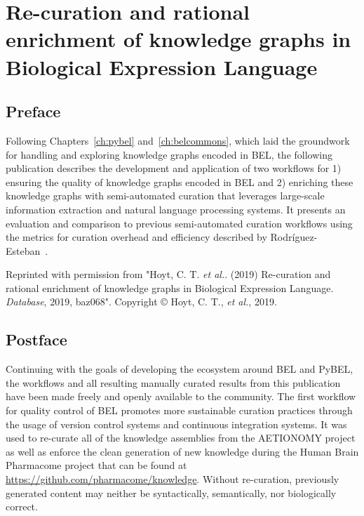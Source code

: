 \chapter{Re-curation and rational enrichment of knowledge graphs in Biological Expression Language}
\label{ch:recuration}

\section*{Preface}

Following Chapters~\ref{ch:pybel} and~\ref{ch:belcommons}, which laid the groundwork for handling and exploring knowledge graphs encoded in \ac{BEL}, the following publication describes the development and application of two workflows for 1) ensuring the quality of knowledge graphs encoded in \ac{BEL} and 2) enriching these knowledge graphs with semi-automated curation that leverages large-scale information extraction and natural language processing systems.
It presents an evaluation and comparison to previous semi-automated curation workflows using the metrics for curation overhead and efficiency described by Rodr\'{i}guez-Esteban~\cite{Rodriguez-Esteban2015}.

\vspace*{\fill}

Reprinted with permission from "Hoyt, C. T. \textit{et al.}. (2019) Re-curation and rational enrichment of knowledge graphs in Biological Expression Language. \textit{Database}, 2019, baz068".
Copyright © Hoyt, C. T., \textit{et al.}, 2019.



\section*{Postface}

Continuing with the goals of developing the ecosystem around \ac{BEL} and PyBEL, the workflows and all resulting manually curated results from this publication have been made freely and openly available to the community.
The first workflow for quality control of \ac{BEL} promotes more sustainable curation practices through the usage of version control systems and continuous integration systems.
It was used to re-curate all of the knowledge assemblies from the AETIONOMY project as well as enforce the clean generation of new knowledge during the Human Brain Pharmacome project that can be found at \url{https://github.com/pharmacome/knowledge}.
Without re-curation, previously generated content may neither be syntactically, semantically, nor biologically correct.

